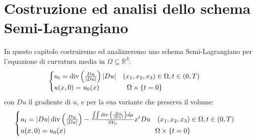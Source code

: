 \chapter{Costruzione ed analisi dello schema Semi-Lagrangiano}
\label{cp:cp2-00}
In questo capitolo costruiremo ed analizzeremo uno schema Semi-Lagrangiano per l'equazione di curvatura media in $\Omega\subseteq\mathbb{R}^3$:
\begin{equation}
\label{eq:cp3-01}
\begin{cases}
u_t = \operatorname{div}\left(\frac{Du}{|Du|}\right)|Du|\quad (x_1,x_2,x_3)\in\Omega,t\in(0,T) \\
u(x,0) = u_0(x) \qquad \quad\quad\Omega\times\{t = 0\}
\end{cases}
\end{equation}
con $Du$ il gradiente di $u$, e per la sua variante che preserva il
volume:
\begin{equation}
\label{eq:cp3-01-vp}
\begin{cases}
 u_t=|Du|\operatorname{div}{\left(\frac{Du}{|Du|}\right)}-\frac{\iint\operatorname{div}{\left(\frac{Du}{|Du|}\right)}d\mu}{3V_0}x^tDu\quad (x_1,x_2,x_3)\in\Omega,t\in(0,T) \\
u(x,0) = u_0(x) \qquad\qquad\qquad\qquad\qquad\qquad\quad\Omega\times\{t = 0\}
\end{cases}
\end{equation}
%
